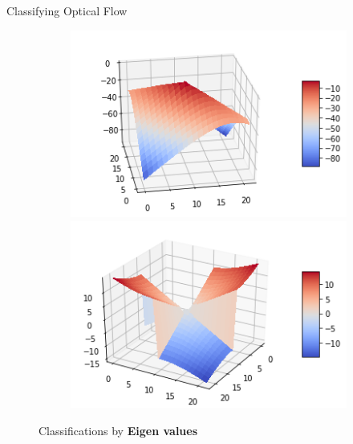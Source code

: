 \documentclass{beamer}
\begin{document}
\begin{frame}{Classifying Optical Flow}
\begin{figure}[]
\begin{subfigure}[b]{0.8\textwidth}
\begin{minipage}{.3\textwidth}
     		\end{minipage}%
     		\begin{minipage}{.3\textwidth}
     			\centering
     			\includegraphics[width=.98\linewidth]{images/node.png}
     			
     		\end{minipage}%
               \begin{minipage}{.3\textwidth}
     			\centering
     			\includegraphics[width=.98\linewidth]{images/saddle.png}
     			
     		\end{minipage}
     	\end{subfigure}
     	
     	
     	

     	\caption{Classifications by \textbf{Eigen values} }\label{failure_1} 
     	
     \end{figure}
     
     
     \end{frame}
\end{document}
